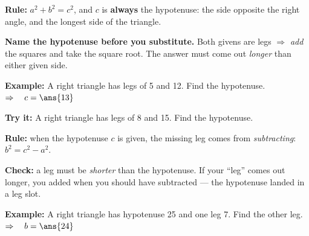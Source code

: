 \documentclass[12pt]{article}
\begin{document}


\begin{formulabox}
\textbf{Rule:} \quad $a^2 + b^2 = c^2$, and $c$ is \textbf{always} the hypotenuse: the
side opposite the right angle, and the longest side of the triangle.\par
\smallskip
\textbf{Name the hypotenuse before you substitute.} Both givens are legs $\Rightarrow$
\emph{add} the squares and take the square root. The answer must come out
\emph{longer} than either given side.
\end{formulabox}

\begin{examplebox}
\textbf{Example:} \quad A right triangle has legs of 5 and 12. Find the hypotenuse.
$\Rightarrow\quad c = \ans{13}$
\end{examplebox}

\begin{tryitbox}
\textbf{Try it:} \quad A right triangle has legs of 8 and 15. Find the hypotenuse.\\[2pt]
\end{tryitbox}


\begin{formulabox}
\textbf{Rule:} \quad when the hypotenuse $c$ is given, the missing leg comes from
\emph{subtracting}: \ $b^2 = c^2 - a^2$.\par
\smallskip
\textbf{Check:} a leg must be \emph{shorter} than the hypotenuse. If your ``leg'' comes
out longer, you added when you should have subtracted --- the hypotenuse landed in a leg
slot.
\end{formulabox}

\begin{examplebox}
\textbf{Example:} \quad A right triangle has hypotenuse 25 and one leg 7. Find the other
leg.
$\Rightarrow\quad b = \ans{24}$
\end{examplebox}
\end{document}
